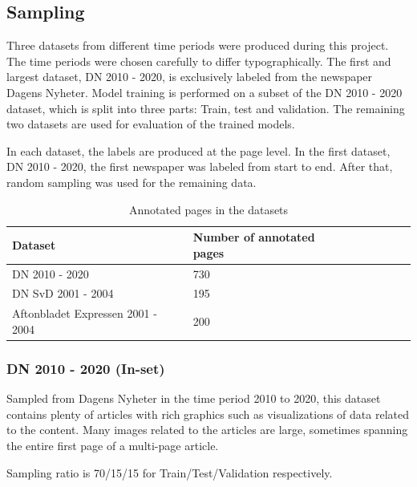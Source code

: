 \documentclass[oneside, english, bibtex]{kththesis}
\begin{document}
\subsection{Sampling}

Three datasets from different time periods were produced during this project.
The time periods were chosen carefully to differ typographically.
The first and largest dataset, DN 2010 - 2020,
is exclusively labeled from the newspaper Dagens Nyheter.
Model training is performed on a subset of the DN 2010 - 2020 dataset,
which is split into three parts: Train, test and validation.
The remaining two datasets are used for evaluation of the trained models.

In each dataset, the labels are produced at the page level.
In the first dataset, DN 2010 - 2020, the first newspaper was labeled from start to end.
After that, random sampling was used for the remaining data.

\begin{table}[!ht]
  \begin{center}
    \caption{Annotated pages in the datasets}
    \label{tab:pagedist}
    \begin{tabular}{l|l|l|l|l|l|l} %
    \textbf{Dataset} & \textbf{Number of annotated pages} \\
    \hline
    DN 2010 - 2020 & 730 \\    \hline
    DN SvD 2001 - 2004 & 195 \\    \hline
    Aftonbladet Expressen 2001 - 2004 & 200  \\    \hline
    \end{tabular}
  \end{center}
\end{table}


\subsubsection{DN 2010 - 2020 (In-set)}

Sampled from Dagens Nyheter in the time period 2010 to 2020,
this dataset contains plenty of articles with rich graphics such as visualizations of data related to the content.
Many images related to the articles are large, sometimes spanning the entire first page of a multi-page article.

Sampling ratio is 70/15/15 for Train/Test/Validation respectively.
\end{document}

